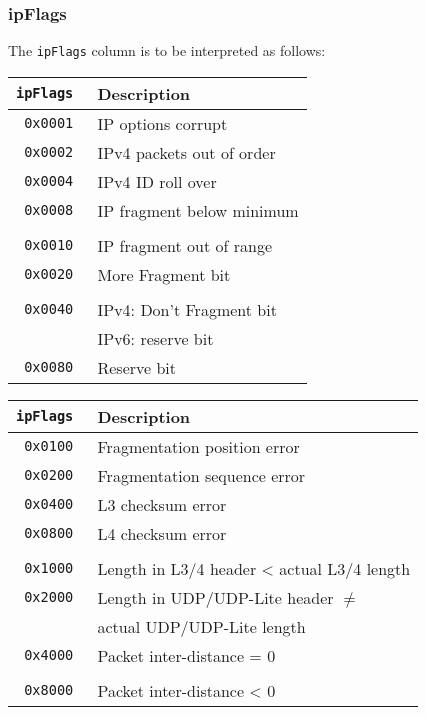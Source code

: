\documentclass[documentation]{subfiles}
\begin{document}
\subsubsection{ipFlags}\label{ipFlags}
The {\tt ipFlags} column is to be interpreted as follows:\\
\begin{minipage}{.48\textwidth}
    \begin{longtable}{>{\tt}rl}
        \toprule
        {\bf ipFlags} & {\bf Description}\\
        \midrule\endhead%
        0x0001 & IP options corrupt\\
        0x0002 & IPv4 packets out of order\\
        0x0004 & IPv4 ID roll over\\
        0x0008 & IP fragment below minimum\\
        \\
        0x0010 & IP fragment out of range\\
        0x0020 & More Fragment bit\\
               &\\
        0x0040 & IPv4: Don't Fragment bit\\
               & IPv6: reserve bit\\
        0x0080 & Reserve bit\\
        \bottomrule
    \end{longtable}
\end{minipage}
\hfill
\begin{minipage}{.48\textwidth}
    \begin{longtable}{>{\tt}rl}
        \toprule
        {\bf ipFlags} & {\bf Description}\\
        \midrule\endhead%
        0x0100 & Fragmentation position error\\
        0x0200 & Fragmentation sequence error\\
        0x0400 & L3 checksum error\\
        0x0800 & L4 checksum error\\
        \\
        0x1000 & Length in L3/4 header < actual L3/4 length\\
        0x2000 & Length in UDP/UDP-Lite header $\neq$\\
               & \qquad actual UDP/UDP-Lite length\\
        0x4000 & Packet inter-distance = 0\\
        \\
        0x8000 & Packet inter-distance < 0\\
        \bottomrule
    \end{longtable}
\end{minipage}
\end{document}
